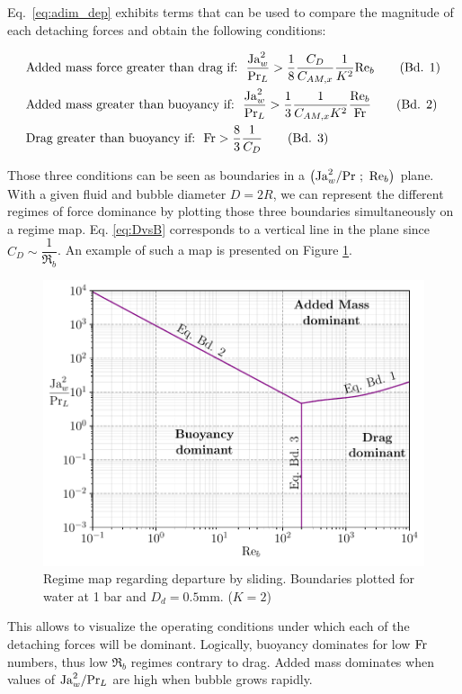 Eq.~\ref{eq:adim_dep} exhibits terms that can be used to compare the magnitude of each detaching forces and obtain the following conditions:

\begin{align}
&\text{Added mass  force greater than drag if:}\ \ \frac{\Ja_{w}^{2}}{\Pr_{L}}>\frac{1}{8}\frac{C_{D}}{C_{AM,x}}\frac{1}{K^{2}}\Re_{b} \tag{Bd. 1} \label{eq:AMvsD}\\
&\text{Added mass greater than buoyancy if:}\ \  \frac{\Ja_{w}^{2}}{\Pr_{L}}>\frac{1}{3}\frac{1}{C_{AM,x}K^{2}}\frac{\Re_{b}}{\Fr} \tag{Bd. 2} \label{eq:AMvsB}\\
&\text{Drag greater than buoyancy if:}\ \  \Fr >\frac{8}{3}\frac{1}{C_{D}} \tag{Bd. 3} \label{eq:DvsB}
\end{align}

Those three conditions can be seen as boundaries in a $\left( \mathrm{Ja}_{w}^{2}/\mathrm{Pr}\ ;\ \mathrm{Re}_{b} \right)$ plane. With a given fluid and bubble diameter $D=2R$, we can represent the different regimes of force dominance by plotting those three boundaries simultaneously on a regime map. Eq. \ref{eq:DvsB} corresponds to a vertical line in the plane since  $C_{D} \sim \dfrac{1}{\Re_{b}}$.  An example of such a map is presented on Figure \ref{fig:ND_map1}.

\begin{figure}[h!]
\centering
\includegraphics[width=0.6\linewidth]{img/bub_dyn/dep_maps/ND_map1.pdf}
\caption{Regime map regarding departure by sliding. Boundaries plotted for water at 1 bar and $D_{d}=0.5$mm. ($K=2$)}
\label{fig:ND_map1}
\end{figure}


This allows to visualize the operating conditions under which each of the detaching forces will be dominant. Logically, buoyancy dominates for low $\mathrm{Fr}$ numbers, thus low $\Re_{b}$ regimes contrary to drag. Added mass dominates when values of $\mathrm{Ja}_{w}^{2}/\mathrm{Pr}_{L}$ are high \ie when bubble grows rapidly.
 


